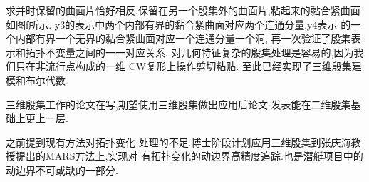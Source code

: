 \documentclass[UTF8]{ctexbeamer}	%
\theoremstyle{plain}
\theoremstyle{definition}
\theoremstyle{remark}
\numberwithin{equation}{section}
\begin{document}
\begin{frame}
  求并时保留的曲面片恰好相反,保留在另一个殷集外的曲面片,粘起来的黏合紧曲面如图f所示.
  y3的表示中两个内部有界的黏合紧曲面对应两个连通分量,y4表示
  的一个内部有界一个无界的黏合紧曲面对应一个连通分量一个洞,
  再一次验证了殷集表示和拓扑不变量之间的一一对应关系.
  对几何特征复杂的殷集处理是容易的,因为我们只在非流行点构成的一维
  CW复形上操作剪切粘贴.
  至此已经实现了三维殷集建模和布尔代数.
\end{frame}

\begin{frame}
  三维殷集工作的论文在写,期望使用三维殷集做出应用后论文
  发表能在二维殷集基础上更上一层.
\end{frame}

\begin{frame}
  之前提到现有方法对拓扑变化
  处理的不足.博士阶段计划应用三维殷集到张庆海教授提出的MARS方法上,实现对
  有拓扑变化的动边界高精度追踪.也是潜艇项目中的动边界不可或缺的一部分.
\end{frame}

\end{document}
